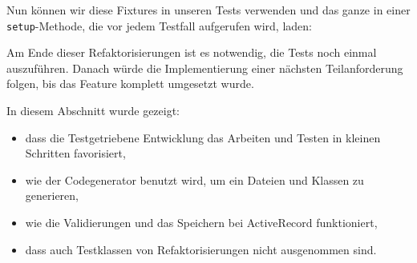 Nun können wir diese Fixtures in unseren Tests verwenden und das ganze in einer \texttt{setup}-Methode, die vor jedem Testfall aufgerufen wird, laden:
\tddrefactor
\begin{ruby}[label=test/unit/job\_test.rb]
   
   
       
    
     
    
      
     
    
      
     
\end{ruby}



Am Ende dieser Refaktorisierungen ist es notwendig, die Tests noch einmal auszuführen.
\tddgreen
Danach würde die Implementierung einer nächsten Teilanforderung folgen, bis das Feature komplett umgesetzt wurde.

In diesem Abschnitt wurde gezeigt:
\begin{itemize}
 \item dass die Testgetriebene Entwicklung das Arbeiten und Testen in kleinen Schritten favorisiert,
 \item wie der Codegenerator benutzt wird, um ein Dateien und Klassen zu generieren,
 \item wie die Validierungen und das Speichern bei ActiveRecord funktioniert,
 \item dass auch Testklassen von Refaktorisierungen nicht ausgenommen sind.
\end{itemize}
